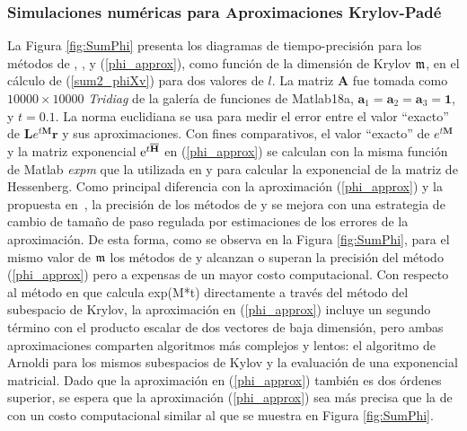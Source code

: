 \subsubsection{Simulaciones numéricas para Aproximaciones Krylov-Padé}
La Figura \ref{fig:SumPhi} presenta los diagramas de tiempo-precisión para los métodos de \cite{hochbruck1997krylov}, \cite{sidje1998expokit}, \cite{niesen2012algorithm} y (\ref{phi_approx}), como función de la dimensión de Krylov $\mathfrak{m}$, en el cálculo de (\ref{sum2_phiXv}) para dos valores de $l$. La matriz $\mathbf{A}$ fue tomada como $10000 \times 10000$ \textit{Tridiag} de la galería de funciones de Matlab18a, $\mathbf{a}_1=\mathbf{a}_2=\mathbf{a}_3=\mathbf{1}$, y $t=0.1$. La norma euclidiana se usa para medir el error entre el valor ``exacto'' de $\mathbf{L} e^{t \mathbf{M}}\mathbf{r}$ y sus aproximaciones. Con fines comparativos, el valor ``exacto'' de $e^{t \mathbf{M}}$ y la matriz exponencial $\mathrm{e}^{t\overline{\mathbf{H}}}$ en (\ref{phi_approx}) se calculan con la misma función de Matlab \textit{expm} que la utilizada en \cite{sidje1998expokit} y \cite{niesen2012algorithm} para calcular la exponencial de la matriz de Hessenberg. Como principal diferencia con la aproximación (\ref{phi_approx}) y la propuesta en~\cite{hochbruck1997krylov}, la precisión de los métodos de \cite{sidje1998expokit} y \cite{niesen2012algorithm} se mejora con una estrategia de cambio de tamaño de paso regulada por estimaciones de los errores de la aproximación. De esta forma, como se observa en la Figura \ref{fig:SumPhi}, para el mismo valor de $\mathfrak{m}$ los métodos de \cite{sidje1998expokit} y \cite{niesen2012algorithm} alcanzan o superan la precisión del método (\ref{phi_approx}) pero a expensas de un mayor costo computacional. Con respecto al método en \cite{hochbruck1997krylov} que calcula exp(M*t) directamente a través del método del subespacio de Krylov, la aproximación en (\ref{phi_approx}) incluye un segundo término con el producto escalar de dos vectores de baja dimensión, pero ambas aproximaciones comparten algoritmos más complejos y lentos: el algoritmo de Arnoldi para los mismos subespacios de Kylov y la evaluación de una exponencial matricial. Dado que la aproximación en (\ref{phi_approx}) también es dos órdenes superior, se espera que la aproximación (\ref{phi_approx}) sea más precisa que la de \cite{hochbruck1997krylov} con un costo computacional similar al que se muestra en Figura \ref{fig:SumPhi}.

